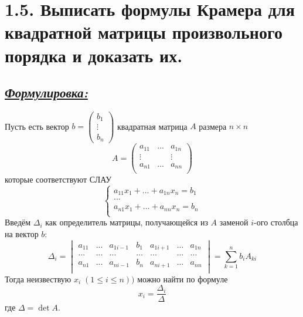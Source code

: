 \documentclass{article}
\begin{document}
\section*{\LARGE 1.5. Выписать формулы Крамера для квадратной матрицы произвольного порядка и доказать их.}
\subsection*{\Large \underline{\textit{Формулировка: }}}
Пусть есть вектор $b = \begin{pmatrix} b_1 \\ \vdots \\ b_n \end{pmatrix}$ квадратная матрица $A$ размера $n \times n$
$$
A = 
\begin{pmatrix}
a_{11} & ... & a_{1n} \\
\vdots &  & \vdots \\
a_{n1} & ... & a_{nn} \\
\end{pmatrix}
$$
которые соответствуют СЛАУ
$$
\begin{cases}
a_{11}x_1 + ... + a_{1n}x_n = b_1 \\
... \\
a_{n1}x_1 + ... + a_{nn}x_n = b_n \\
\end{cases}
$$
Введём $\Delta_i$ как определитель матрицы, получающейся из $A$ заменой $i$-ого столбца на вектор $b$:
$$
\Delta_i = 
\begin{vmatrix}
a_{11} & ... & a_{1i-1} & b_1 & a_{1i+1} & ... & a_{1n} \\
... & ... & ... & ... & ... & ... & ... \\
a_{n1} & ... & a_{ni-1} & b_n & a_{ni+1} & ... & a_{nn} \\
\end{vmatrix} = 
\sum_{k = 1}^{n}b_iA_{ki}
$$
Тогда неизвествую $x_i \; (1 \le i \le n))$ можно найти по формуле
$$
x_i = \frac{\Delta_i}{\Delta}
$$
где $\Delta = \det{A}$.
\end{document}

